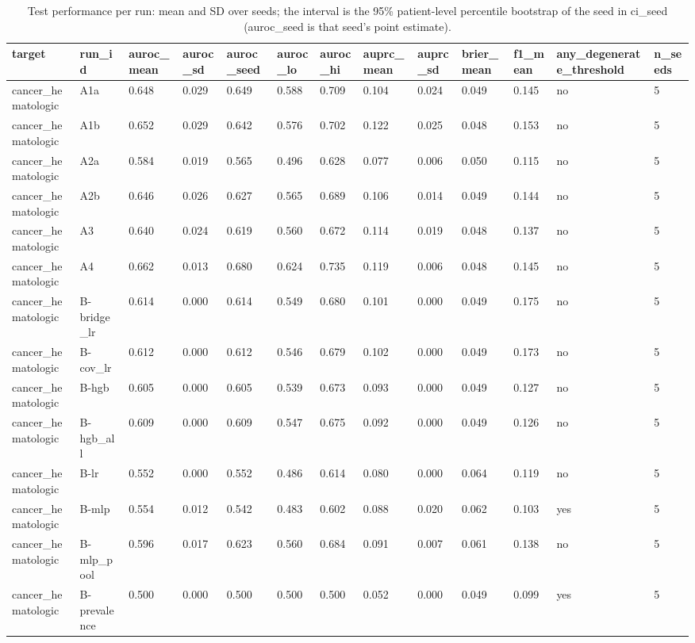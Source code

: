 \begin{table}[t]
\centering\small
\caption{Test performance per run: mean and SD over seeds; the interval is the 95\% patient-level percentile bootstrap of the seed in ci\_seed (auroc\_seed is that seed's point estimate).}\label{tab:runs}
\begin{tabular}{lllllllllllll}
\toprule
target & run\_id & auroc\_mean & auroc\_sd & auroc\_seed & auroc\_lo & auroc\_hi & auprc\_mean & auprc\_sd & brier\_mean & f1\_mean & any\_degenerate\_threshold & n\_seeds \\
\midrule
cancer\_hematologic & A1a & 0.648 & 0.029 & 0.649 & 0.588 & 0.709 & 0.104 & 0.024 & 0.049 & 0.145 & no & 5 \\
cancer\_hematologic & A1b & 0.652 & 0.029 & 0.642 & 0.576 & 0.702 & 0.122 & 0.025 & 0.048 & 0.153 & no & 5 \\
cancer\_hematologic & A2a & 0.584 & 0.019 & 0.565 & 0.496 & 0.628 & 0.077 & 0.006 & 0.050 & 0.115 & no & 5 \\
cancer\_hematologic & A2b & 0.646 & 0.026 & 0.627 & 0.565 & 0.689 & 0.106 & 0.014 & 0.049 & 0.144 & no & 5 \\
cancer\_hematologic & A3 & 0.640 & 0.024 & 0.619 & 0.560 & 0.672 & 0.114 & 0.019 & 0.048 & 0.137 & no & 5 \\
cancer\_hematologic & A4 & 0.662 & 0.013 & 0.680 & 0.624 & 0.735 & 0.119 & 0.006 & 0.048 & 0.145 & no & 5 \\
cancer\_hematologic & B-bridge\_lr & 0.614 & 0.000 & 0.614 & 0.549 & 0.680 & 0.101 & 0.000 & 0.049 & 0.175 & no & 5 \\
cancer\_hematologic & B-cov\_lr & 0.612 & 0.000 & 0.612 & 0.546 & 0.679 & 0.102 & 0.000 & 0.049 & 0.173 & no & 5 \\
cancer\_hematologic & B-hgb & 0.605 & 0.000 & 0.605 & 0.539 & 0.673 & 0.093 & 0.000 & 0.049 & 0.127 & no & 5 \\
cancer\_hematologic & B-hgb\_all & 0.609 & 0.000 & 0.609 & 0.547 & 0.675 & 0.092 & 0.000 & 0.049 & 0.126 & no & 5 \\
cancer\_hematologic & B-lr & 0.552 & 0.000 & 0.552 & 0.486 & 0.614 & 0.080 & 0.000 & 0.064 & 0.119 & no & 5 \\
cancer\_hematologic & B-mlp & 0.554 & 0.012 & 0.542 & 0.483 & 0.602 & 0.088 & 0.020 & 0.062 & 0.103 & yes & 5 \\
cancer\_hematologic & B-mlp\_pool & 0.596 & 0.017 & 0.623 & 0.560 & 0.684 & 0.091 & 0.007 & 0.061 & 0.138 & no & 5 \\
cancer\_hematologic & B-prevalence & 0.500 & 0.000 & 0.500 & 0.500 & 0.500 & 0.052 & 0.000 & 0.049 & 0.099 & yes & 5 \\

\end{tabular}
\end{table}
